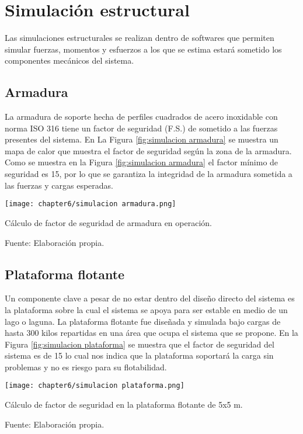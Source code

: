 \section{Simulación estructural}

Las simulaciones estructurales se realizan dentro de softwares que permiten simular fuerzas, momentos y esfuerzos a los que se estima estará sometido los componentes mecánicos del sistema.

\subsection{Armadura}

La armadura de soporte hecha de perfiles cuadrados de acero inoxidable con norma ISO 316 tiene un factor de seguridad (F.S.) de sometido a las fuerzas presentes del sistema. En La Figura \ref{fig:simulacion armadura} se muestra un mapa de calor que muestra el factor de seguridad según la zona de la armadura. Como se muestra en la Figura  \ref{fig:simulacion armadura} el factor mínimo de seguridad es 15, por lo que se garantiza la integridad de la armadura sometida a las fuerzas y cargas esperadas.

\begin{myfigure}[H]
	\footnotesize\centering
	\texttt{[image: chapter6/simulacion armadura.png]}
	\caption{Cálculo de factor de seguridad de armadura en operación.}
	\begin{myflushcenter}
		Fuente: Elaboración propia.
	\end{myflushcenter}
	\label{fig:simulacion armadura}
\end{myfigure}


\subsection{Plataforma flotante}

Un componente clave a pesar de no estar dentro del diseño directo del sistema es la plataforma sobre la cual el sistema se apoya para ser estable en medio de un lago o laguna. La plataforma flotante fue diseñada y simulada bajo cargas de hasta 300 kilos repartidas en una área que ocupa el sistema que se propone. En la Figura \ref{fig:simulacion plataforma} se muestra que el factor de seguridad del sistema es de 15 lo cual nos indica que la plataforma soportará la carga sin problemas y no es riesgo para su flotabilidad.

\begin{myfigure}[H]
	\footnotesize\centering
	\texttt{[image: chapter6/simulacion plataforma.png]}
	\caption{Cálculo de factor de seguridad en la plataforma flotante de 5x5 m.}
	\begin{myflushcenter}
		Fuente: Elaboración propia.
	\end{myflushcenter}
	\label{fig:simulacion plataforma}
\end{myfigure}


